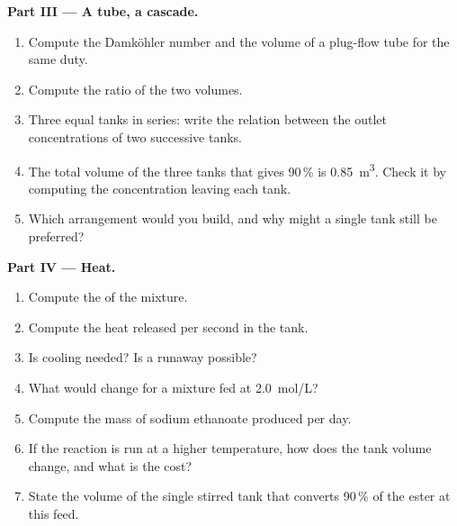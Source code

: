 \begin{problem}
\medskip
\noindent\textbf{Part III --- A tube, a cascade.}
\begin{enumerate}[resume]
  \item Compute the Damköhler number and the volume of a plug-flow tube for
        the same duty.
  \item Compute the ratio of the two volumes.
  \item Three equal tanks in series: write the relation between the outlet
        concentrations of two successive tanks.
  \item The total volume of the three tanks that gives 90\,\% is
        \qty{0.85}{m^3}. Check it by computing the concentration leaving each
        tank.
  \item Which arrangement would you build, and why might a single tank still
        be preferred?
\end{enumerate}

\medskip
\noindent\textbf{Part IV --- Heat.}
\begin{enumerate}[resume]
  \item Compute the  of the mixture.
  \item Compute the heat released per second in the tank.
  \item Is cooling needed? Is a runaway possible?
  \item What would change for a mixture fed at \qty{2.0}{mol/L}?
  \item Compute the mass of sodium ethanoate produced per day.
  \item If the reaction is run at a higher temperature, how does the tank
        volume change, and what is the cost?
  \item State the volume of the single stirred tank that converts 90\,\% of
        the ester at this feed.
\end{enumerate}
\end{problem}
